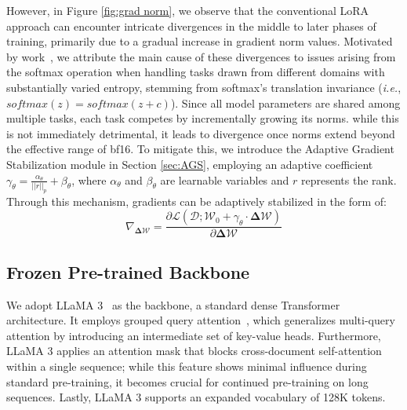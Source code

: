 However, in Figure \ref{fig:grad norm}, we observe that the conventional LoRA approach can encounter intricate divergences in the middle to later phases of training, primarily due to a gradual increase in gradient norm values. Motivated by work~\cite{kalajdzievski2023rank,team2024chameleon}, we attribute the main cause of these divergences to issues arising from the softmax operation when handling tasks drawn from different domains with substantially varied entropy, stemming from softmax’s translation invariance (\emph{i.e.}, $softmax \left( z \right) = softmax \left( z + c \right)$). Since all model parameters are shared among multiple tasks, each task competes by incrementally growing its norms. while this is not immediately detrimental, it leads to divergence once norms extend beyond the effective range of bf16. To mitigate this, we introduce the Adaptive Gradient Stabilization module in Section \ref{sec:AGS}, employing an adaptive coefficient $\gamma_{\theta} =  \frac{\alpha_{\theta}}{||r||_p} + \beta_{\theta}$, where $\alpha_{\theta}$ and $\beta_{\theta}$ are learnable variables and $r$ represents the rank. Through this mechanism, gradients can be adaptively stabilized in the form of:
\begin{equation}
\nabla_{\boldsymbol{\Delta{\mathcal{W}}}} = \frac{\partial \mathcal{L}\left( \mathcal{D};\boldsymbol{\mathcal{W}}_0 + \gamma_{\theta} \cdot \boldsymbol{\Delta{\mathcal{W}}} \right)}{\partial \boldsymbol{\Delta{\mathcal{W}}}}
\end{equation}

\subsection{Frozen Pre-trained Backbone}
We adopt LLaMA 3~\cite{dubey2024llama} as the backbone, a standard dense Transformer~\cite{vaswani2017attention} architecture. It employs grouped query attention~\cite{ainslie2023gqa}, which generalizes multi-query attention by introducing an intermediate set of key-value heads. Furthermore, LLaMA 3 applies an attention mask that blocks cross-document self-attention within a single sequence; while this feature shows minimal influence during standard pre-training, it becomes crucial for continued pre-training on long sequences. Lastly, LLaMA 3 supports an expanded vocabulary of 128K tokens.

